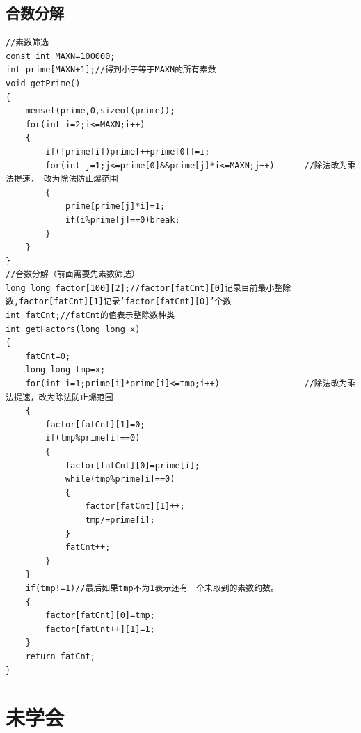 \documentclass[twoside]{article}
\begin{document}
\subsection{合数分解}
\begin{lstlisting}
//素数筛选
const int MAXN=100000;
int prime[MAXN+1];//得到小于等于MAXN的所有素数
void getPrime()
{
    memset(prime,0,sizeof(prime));
    for(int i=2;i<=MAXN;i++)
    {
        if(!prime[i])prime[++prime[0]]=i;
        for(int j=1;j<=prime[0]&&prime[j]*i<=MAXN;j++)      //除法改为乘法提速， 改为除法防止爆范围
        {
            prime[prime[j]*i]=1;
            if(i%prime[j]==0)break;
        }
    }
}
//合数分解（前面需要先素数筛选）
long long factor[100][2];//factor[fatCnt][0]记录目前最小整除数,factor[fatCnt][1]记录‘factor[fatCnt][0]’个数
int fatCnt;//fatCnt的值表示整除数种类
int getFactors(long long x)
{
    fatCnt=0;
    long long tmp=x;
    for(int i=1;prime[i]*prime[i]<=tmp;i++)                 //除法改为乘法提速，改为除法防止爆范围
    {
        factor[fatCnt][1]=0;
        if(tmp%prime[i]==0)
        {
            factor[fatCnt][0]=prime[i];
            while(tmp%prime[i]==0)
            {
                factor[fatCnt][1]++;
                tmp/=prime[i];
            }
            fatCnt++;
        }
    }
    if(tmp!=1)//最后如果tmp不为1表示还有一个未取到的素数约数。
    {
        factor[fatCnt][0]=tmp;
        factor[fatCnt++][1]=1;
    }
    return fatCnt;
}\end{lstlisting}
\clearpage\section{未学会}
\end{document}
